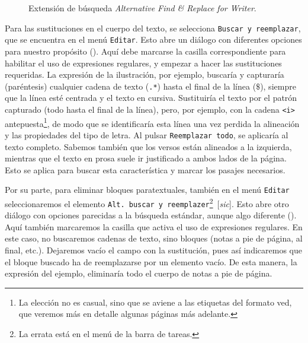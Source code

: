 \begin{figure}[!ht]
	\centering\small
	\caption{Extensión de búsqueda \emph{Alternative Find \& Replace for Writer}.}
	\label{fig:asearchandreplace}
\end{figure}

Para las sustituciones en el cuerpo del texto, se selecciona \texttt{Buscar y reemplazar}, que se encuentra en el menú \texttt{Editar}. Esto abre un diálogo con diferentes opciones para nuestro propósito (). Aquí debe marcarse la casilla correspondiente para habilitar el uso de expresiones regulares, y empezar a hacer las sustituciones requeridas. La expresión de la ilustración, por ejemplo, buscaría y capturaría (paréntesis) cualquier cadena de texto (\texttt{.*}) hasta el final de la línea ($\$$), siempre que la línea esté centrada y el texto en cursiva. Sustituiría el texto por el patrón capturado (todo hasta el final de la línea), pero, por ejemplo, con la cadena \texttt{<i>} antepuesta\footnote{La elección no es casual, sino que se aviene a las etiquetas del formato \ac{ved}, que veremos más en detalle algunas páginas más adelante.}, de modo que se identificaría esta línea una vez perdida la alineación y las propiedades del tipo de letra. Al pulsar \texttt{Reemplazar todo}, se aplicaría al texto completo. Sabemos también que los versos están alineados a la izquierda, mientras que el texto en prosa suele ir justificado a ambos lados de la página. Esto se aplica para buscar esta característica y marcar los pasajes necesarios.

Por su parte, para eliminar bloques paratextuales, también en el menú \texttt{Editar} seleccionaremos el elemento \texttt{Alt. buscar y reemplazer}\footnote{La errata está en el menú de la barra de tareas.}~[\textit{sic}]. Esto abre otro diálogo con opciones parecidas a la búsqueda estándar, aunque algo diferente (). Aquí también marcaremos la casilla que activa el uso de expresiones regulares. En este caso, no buscaremos cadenas de texto, sino bloques (notas a pie de página, al final, etc.). Dejaremos vacío el campo con la sustitución, pues así indicaremos que el bloque buscado ha de reemplazarse por un elemento vacío. De esta manera, la expresión del ejemplo, eliminaría todo el cuerpo de notas a pie de página.

